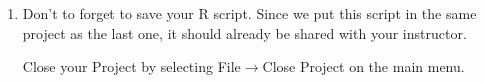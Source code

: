 \documentclass[12pt]{article}
\newcommand{\arrow}{\ensuremath{\rightarrow}}
\begin{document}
\begin{enumerate}
\item Don’t to forget to save your R script. Since we put this script in the same project
as the last one, it should already be shared with your
instructor.

Close your Project by selecting File\arrow Close Project on the main menu.

\end{enumerate}
\end{document}
